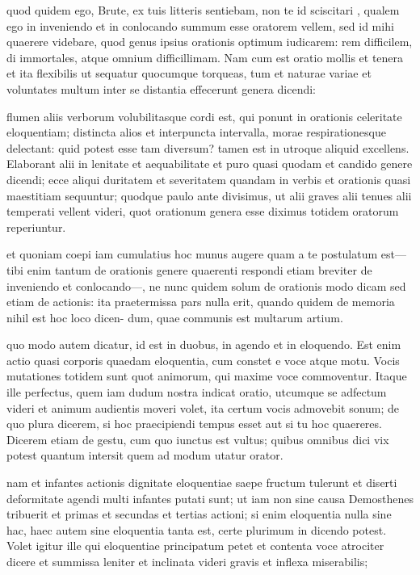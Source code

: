  quod quidem ego, Brute, ex tuis litteris sentiebam, non te id sciscitari , qualem ego in inveniendo et in conlocando summum esse oratorem vellem, sed id mihi quaerere videbare, quod genus ipsius orationis optimum iudicarem: rem difficilem, di immortales, atque omnium difficillimam. Nam cum est oratio mollis et tenera et ita flexibilis ut sequatur quocumque torqueas, tum et naturae variae et voluntates multum inter se distantia effecerunt genera dicendi:

 flumen aliis verborum volubilitasque cordi est, qui ponunt in orationis celeritate eloquentiam; distincta alios et interpuncta intervalla, morae respirationesque delectant: quid potest esse tam diversum? tamen est in utroque aliquid excellens. Elaborant alii in lenitate et aequabilitate et puro quasi quodam et candido genere dicendi; ecce aliqui duritatem et severitatem quandam in verbis et orationis quasi maestitiam sequuntur; quodque paulo ante divisimus, ut alii graves alii tenues alii temperati vellent videri, quot orationum genera esse diximus totidem oratorum reperiuntur.

 et quoniam coepi iam cumulatius hoc munus augere quam a te postulatum est—tibi enim tantum de orationis genere quaerenti respondi etiam breviter de inveniendo et conlocando—, ne nunc quidem solum de orationis modo dicam sed etiam de actionis: ita praetermissa pars nulla erit, quando quidem de memoria nihil est hoc loco dicen- dum, quae communis est multarum artium.

 quo modo autem dicatur, id est in duobus, in agendo et in eloquendo. Est enim actio quasi corporis quaedam eloquentia, cum constet e voce atque motu. Vocis mutationes totidem sunt quot animorum, qui maxime voce commoventur. Itaque ille perfectus, quem iam dudum nostra indicat oratio, utcumque se adfectum videri et animum audientis moveri volet, ita certum vocis admovebit sonum; de quo plura dicerem, si hoc praecipiendi tempus esset aut si tu hoc quaereres. Dicerem etiam de gestu, cum quo iunctus est vultus; quibus omnibus dici vix potest quantum intersit quem ad modum utatur orator.

 nam et infantes actionis dignitate eloquentiae saepe fructum tulerunt et diserti deformitate agendi multi infantes putati sunt; ut iam non sine causa Demosthenes tribuerit et primas et secundas et tertias actioni; si enim eloquentia nulla sine hac, haec autem sine eloquentia tanta est, certe plurimum in dicendo potest. Volet igitur ille qui eloquentiae principatum petet et contenta voce atrociter dicere et summissa leniter et inclinata videri gravis et inflexa miserabilis;


